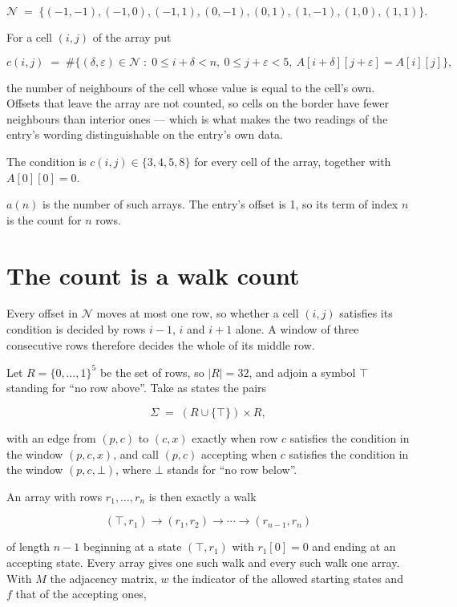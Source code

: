 \documentclass[11pt]{article}
\theoremstyle{definition}
\begin{document}
\[\mathcal{N} \;=\; \{(-1,-1), (-1,0), (-1,1), (0,-1), (0,1), (1,-1), (1,0), (1,1)\}.\]

For a cell $(i,j)$ of the array put

\[c(i,j) \;=\; \#\bigl\{(\delta,\varepsilon)\in\mathcal{N} \;:\; 0\le i+\delta<n,\ 0\le j+\varepsilon<5,\ A[i+\delta][j+\varepsilon] = A[i][j]\bigr\},\]

the number of neighbours of the cell whose value is equal to the cell's own. Offsets that leave the array are not counted, so cells on the border have fewer neighbours than interior ones --- which is what makes the two readings of the entry's wording distinguishable on the entry's own data.

The condition is $c(i,j) \in \{3, 4, 5, 8\}$ for every cell of the array, together with $A[0][0]=0$.

$a(n)$ is the number of such arrays. The entry's offset is 1, so its term of index $n$ is the count for $n$ rows.

\section{The count is a walk count}

Every offset in $\mathcal{N}$ moves at most one row, so whether a cell $(i,j)$ satisfies its condition is decided by rows $i-1$, $i$ and $i+1$ alone. A window of three consecutive rows therefore decides the whole of its middle row.

Let $R = \{0,\dots,1\}^{5}$ be the set of rows, so $|R| = 32$, and adjoin a symbol $\top$ standing for ``no row above''. Take as states the pairs

\[\Sigma \;=\; (R \cup \{\top\}) \times R,\]

with an edge from $(p,c)$ to $(c,x)$ exactly when row $c$ satisfies the condition in the window $(p,c,x)$, and call $(p,c)$ accepting when $c$ satisfies the condition in the window $(p,c,\bot)$, where $\bot$ stands for ``no row below''.

An array with rows $r_1,\dots,r_n$ is then exactly a walk

\[(\top,r_1) \to (r_1,r_2) \to \cdots \to (r_{n-1},r_n)\]

of length $n-1$ beginning at a state $(\top,r_1)$ with $r_1[0]=0$ and ending at an accepting state. Every array gives one such walk and every such walk one array. With $M$ the adjacency matrix, $w$ the indicator of the allowed starting states and $f$ that of the accepting ones,
\end{document}
